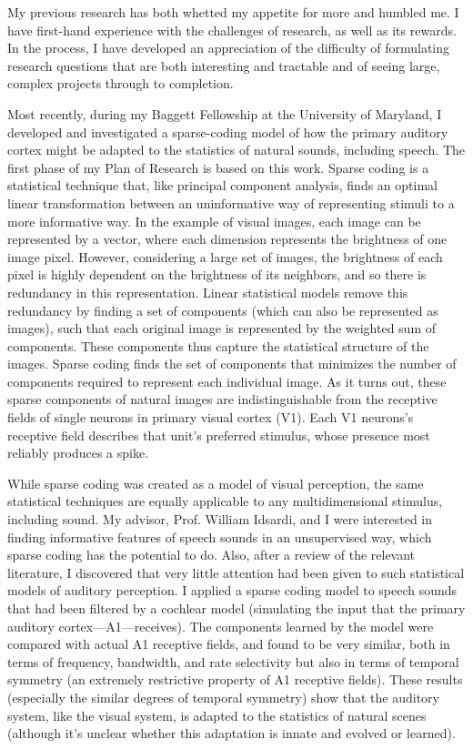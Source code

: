 \documentclass[12pt]{article}
\begin{document}
My previous research has both whetted my appetite for more and humbled me.  I have first-hand experience with the challenges of research, as well as its rewards.  In the process, I have developed an appreciation of the difficulty of formulating research questions that are both interesting and tractable and of seeing large, complex projects through to completion.

Most recently, during my Baggett Fellowship at the University of Maryland, I developed and investigated a sparse-coding model of how the primary auditory cortex might be adapted to the statistics of natural sounds, including speech.  The first phase of my Plan of Research is based on this work.  Sparse coding is a statistical technique that, like principal component analysis, finds an optimal linear transformation between an uninformative way of representing stimuli to a more informative way.  In the example of visual images, each image can be represented by a vector, where each dimension represents the brightness of one image pixel.  However, considering a large set of images, the brightness of each pixel is highly dependent on the brightness of its neighbors, and so there is redundancy in this representation.  Linear statistical models remove this redundancy by finding a set of components (which can also be represented as images), such that each original image is represented by the weighted sum of components.  These components thus capture the statistical structure of the images.  Sparse coding finds the set of components that minimizes the number of components required to represent each individual image.  As it turns out, these sparse components of natural images are indistinguishable from the receptive fields of single neurons in primary visual cortex (V1)\cite{Olshausen1996}.  Each V1 neurons's receptive field describes that unit's preferred stimulus, whose presence most reliably produces a spike.

While sparse coding was created as a model of visual perception, the same statistical techniques are equally applicable to any multidimensional stimulus, including sound.  My advisor, Prof. William Idsardi, and I were interested in finding informative features of speech sounds in an unsupervised way, which sparse coding has the potential to do.  Also, after a review of the relevant literature, I discovered that very little attention had been given to such statistical models of auditory perception.  I applied a sparse coding model to speech sounds that had been filtered by a cochlear model (simulating the input that the primary auditory cortex---A1---receives).  The components learned by the model were compared with actual A1 receptive fields, and found to be very similar, both in terms of frequency, bandwidth, and rate selectivity but also in terms of temporal symmetry\cite{Kleinschmidt2010} (an extremely restrictive property of A1 receptive fields\cite{Simon2007}).  These results (especially the similar degrees of temporal symmetry) show that the auditory system, like the visual system, is adapted to the statistics of natural scenes (although it's unclear whether this adaptation is innate and evolved or learned).
\end{document}
